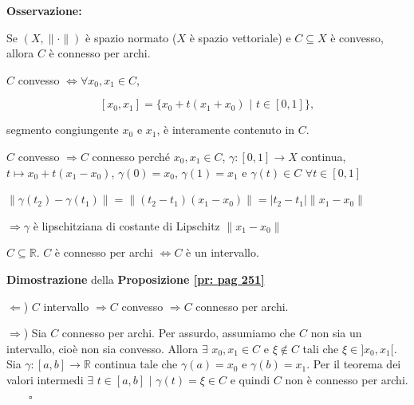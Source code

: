 \textbf{Osservazione:}

Se $(X, \|\cdot\|)$ è spazio normato {\color{blue}($X$ è spazio vettoriale)} e $C \subseteq X$ è convesso, allora $C$ è connesso per archi. 

$C$ convesso $\Leftrightarrow \forall x_0,x_1\in C$, 

$$[x_0,x_1]=\{x_0+t(x_1+x_0)\,\, \big|\,\,t \in [0,1]\},$$

segmento congiungente $x_0$ e $x_1$, è interamente contenuto in $C$. 

$C$ convesso $\Rightarrow C$ connesso perché $x_0, x_1 \in C$, $\gamma:[0,1]\rightarrow X$ continua, $t \mapsto x_0+t(x_1-x_0)$, $\gamma(0)=x_0$, $\gamma(1)=x_1$ e $\gamma(t)\in C$ $\forall t \in [0,1]$ 

{\color{blue}$\|\gamma(t_2)-\gamma(t_1)\|=\|(t_2-t_1)(x_1-x_0)\|=|t_2-t_1|\|x_1-x_0\|$
	
$\Rightarrow \gamma$ è lipschitziana di costante di Lipschitz $\|x_1-x_0\|$}


\begin{proposition}
	\label{pr: pag 251}
	$C \subseteq \mathbb{R}$. $C$ è connesso per archi $\Leftrightarrow C$ è un intervallo.
	
\end{proposition}


\begin{dembar}
	\textbf{Dimostrazione} della \textbf{Proposizione \ref{pr: pag 251}}
	
	$\Leftarrow$) $C$ intervallo $\Rightarrow C$ convesso $\Rightarrow C$ connesso per archi.
	
	$\Rightarrow$) Sia $C$ connesso per archi. Per assurdo, assumiamo che $C$ non sia un intervallo, cioè non sia convesso. Allora $\exists\,\, x_0,x_1 \in C$ e $\xi \notin C$ tali che $\xi \in ]x_0,x_1[$. Sia $\gamma:[a,b]\rightarrow \mathbb{R}$ continua tale che $\gamma(a)=x_0$ e $\gamma(b)=x_1$. Per il teorema dei valori intermedi $\exists\,\, t \in [a,b]\,\, \big|\,\, \gamma(t)=\xi \in C$ e quindi $C$ non è connesso per archi. $\qquad\square$
\end{dembar}


